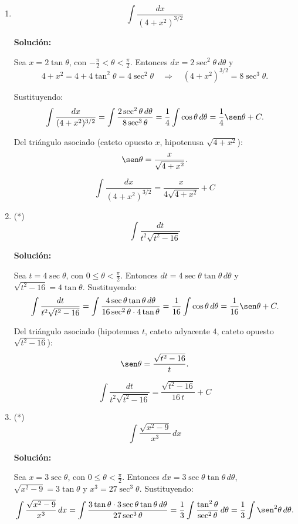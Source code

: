 \documentclass[12pt]{article}
\newcommand{\solucion}{%
    \vspace{0.8em}%
    \textbf{Solución:}%
}
\begin{document}
\begin{enumerate}[label=\alph*.-]
    Del triángulo asociado (cateto opuesto $z$, cateto adyacente $1$,
    hipotenusa $\sqrt{1+z^2}$):
    \[
    \sec\theta=\sqrt{1+z^2},\qquad
    \csc\theta+\cot\theta=\frac{\sqrt{1+z^2}+1}{z}.
    \]

    \[
    \boxed{
    \int\frac{\sqrt{1+z^2}}{z}\,dz
    =\sqrt{1+z^2}-\ln\left|\frac{1+\sqrt{1+z^2}}{z}\right|+C
    }
    \]


    \item
    \[
    \int\frac{dx}{(4+x^2)^{3/2}}
    \]

    \solucion

    Sea $x=2\tan\theta$, con $-\frac\pi2<\theta<\frac\pi2$. Entonces
    $dx=2\sec^2\theta\,d\theta$ y
    \[
    4+x^2=4+4\tan^2\theta=4\sec^2\theta
    \quad\Rightarrow\quad
    (4+x^2)^{3/2}=8\sec^3\theta.
    \]

    Sustituyendo:
    \[
    \int\frac{dx}{(4+x^2)^{3/2}}
    =\int\frac{2\sec^2\theta\,d\theta}{8\sec^3\theta}
    =\frac14\int\cos\theta\,d\theta=\frac14\sen\theta+C.
    \]

    Del triángulo asociado (cateto opuesto $x$, hipotenusa
    $\sqrt{4+x^2}$):
    \[
    \sen\theta=\frac{x}{\sqrt{4+x^2}}.
    \]

    \[
    \boxed{
    \int\frac{dx}{(4+x^2)^{3/2}}=\frac{x}{4\sqrt{4+x^2}}+C
    }
    \]


    \item (*)
    \[
    \int\frac{dt}{t^2\sqrt{t^2-16}}
    \]

    \solucion

    Sea $t=4\sec\theta$, con $0\le\theta<\frac\pi2$. Entonces
    $dt=4\sec\theta\tan\theta\,d\theta$ y $\sqrt{t^2-16}=4\tan\theta$.
    Sustituyendo:
    \[
    \int\frac{dt}{t^2\sqrt{t^2-16}}
    =\int\frac{4\sec\theta\tan\theta\,d\theta}{16\sec^2\theta\cdot4\tan\theta}
    =\frac{1}{16}\int\cos\theta\,d\theta=\frac{1}{16}\sen\theta+C.
    \]

    Del triángulo asociado (hipotenusa $t$, cateto adyacente $4$,
    cateto opuesto $\sqrt{t^2-16}$):
    \[
    \sen\theta=\frac{\sqrt{t^2-16}}{t}.
    \]

    \[
    \boxed{
    \int\frac{dt}{t^2\sqrt{t^2-16}}=\frac{\sqrt{t^2-16}}{16\,t}+C
    }
    \]


    \item (*)
    \[
    \int\frac{\sqrt{x^2-9}}{x^3}\,dx
    \]

    \solucion

    Sea $x=3\sec\theta$, con $0\le\theta<\frac\pi2$. Entonces
    $dx=3\sec\theta\tan\theta\,d\theta$, $\sqrt{x^2-9}=3\tan\theta$ y
    $x^3=27\sec^3\theta$. Sustituyendo:
    \[
    \int\frac{\sqrt{x^2-9}}{x^3}\,dx
    =\int\frac{3\tan\theta\cdot3\sec\theta\tan\theta\,d\theta}{27\sec^3\theta}
    =\frac13\int\frac{\tan^2\theta}{\sec^2\theta}\,d\theta
    =\frac13\int\sen^2\theta\,d\theta.
    \]


\end{enumerate}
\end{document}
